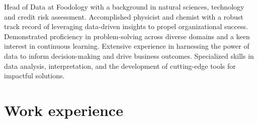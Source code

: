 \documentclass[11pt, letterpaper, sans]{moderncv}        %
\begin{document}
\maketitle

\small{
Head of Data at Foodology with a background in natural sciences, technology and credit risk assessment. Accomplished physicist and chemist with a robust track record of leveraging data-driven insights to propel organizational success. Demonstrated proficiency in problem-solving across diverse domains and a keen interest in continuous learning. Extensive experience in harnessing the power of data to inform decision-making and drive business outcomes. Specialized skills in data analysis, interpretation, and the development of cutting-edge tools for impactful solutions.
}

\section{Work experience}
\end{document}
